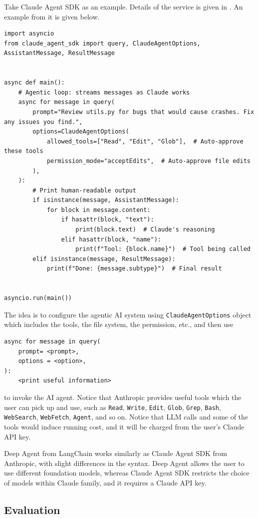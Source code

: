 Take Claude Agent SDK as an example. Details of the service is given in \cite{anthropic2026agentSDK}. An example from it is given below.
\begin{lstlisting}
import asyncio
from claude_agent_sdk import query, ClaudeAgentOptions, AssistantMessage, ResultMessage


async def main():
    # Agentic loop: streams messages as Claude works
    async for message in query(
        prompt="Review utils.py for bugs that would cause crashes. Fix any issues you find.",
        options=ClaudeAgentOptions(
            allowed_tools=["Read", "Edit", "Glob"],  # Auto-approve these tools
            permission_mode="acceptEdits",  # Auto-approve file edits
        ),
    ):
        # Print human-readable output
        if isinstance(message, AssistantMessage):
            for block in message.content:
                if hasattr(block, "text"):
                    print(block.text)  # Claude's reasoning
                elif hasattr(block, "name"):
                    print(f"Tool: {block.name}")  # Tool being called
        elif isinstance(message, ResultMessage):
            print(f"Done: {message.subtype}")  # Final result


asyncio.run(main())
\end{lstlisting}

The idea is to configure the agentic AI system using \texttt{ClaudeAgentOptions} object which includes the tools, the file system, the permission, etc., and then use
\begin{lstlisting}
async for message in query(
    prompt= <prompt>,
    options = <option>,
):
    <print useful information>
\end{lstlisting}
to invoke the AI agent. Notice that Anthropic provides useful tools which the user can pick up and use, such as \verb|Read|, \verb|Write|, \verb|Edit|, \verb|Glob|, \verb|Grep|, \verb|Bash|, \verb|WebSearch|, \verb|WebFetch|, \verb|Agent|, and so on. Notice that LLM calls and some of the tools would induce running cost, and it will be charged from the user's Claude API key.

Deep Agent from LangChain works similarly as Claude Agent SDK from Anthropic, with slight differences in the syntax. Deep Agent allows the user to use different foundation models, whereas Claude Agent SDK restricts the choice of models within Claude family, and it requires a Claude API key.

\subsection{Evaluation}

